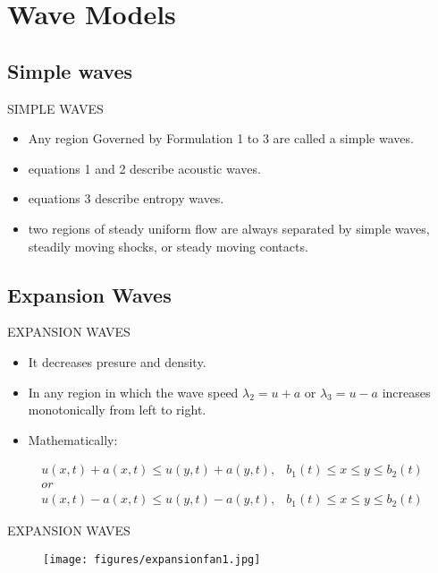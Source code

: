 \documentclass{beamer}
\begin{document}
\section{Wave Models}

\subsection{Simple waves}

\begin{frame}{SIMPLE WAVES}
  \begin{itemize}
   \item Any region Governed by Formulation 1 to 3 are called a simple waves.
   \item equations 1 and 2 describe acoustic waves.
   \item equations 3 describe entropy waves.
   \item two regions of steady uniform flow are always separated by simple waves, steadily moving shocks, or steady moving contacts.
  \end{itemize}
\end{frame}

\subsection{Expansion Waves}

\begin{frame}{EXPANSION WAVES}
  \begin{itemize}
   \item It decreases presure and density.
   \item In any region in which the wave speed $\lambda_2=u+a$ or $\lambda_3=u-a$ increases monotonically from left to right. 
   \item Mathematically:
  \end{itemize}
  \begin{equation}
  \begin{matrix}
  u(x,t)+a(x,t)\leq{u(y,t)+a(y,t)}, & b_1(t)\leq{x}\leq{y}\leq{b_2(t)}\\
  or \\
  u(x,t)-a(x,t)\leq{u(y,t)-a(y,t)}, & b_1(t)\leq{x}\leq{y}\leq{b_2(t)}
  \end{matrix}
  \end{equation} 
\end{frame}

\begin{frame}{EXPANSION WAVES}
  \begin{figure}
   \texttt{[image: figures/expansionfan1.jpg]}
  \end{figure}
\end{frame}
\end{document}
